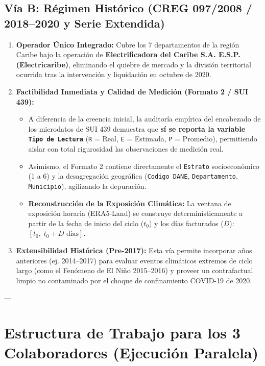 \documentclass[11pt,a4paper]{article}
\begin{document}
\subsection{Vía B: Régimen Histórico (CREG 097/2008 / 2018--2020 y Serie Extendida)}
\begin{enumerate}[label=\alph*.]
    \item \textbf{Operador Único Integrado:} Cubre los 7 departamentos de la región Caribe bajo la operación de 
    \textbf{Electrificadora del Caribe S.A. E.S.P. (Electricaribe)}, eliminando el quiebre de mercado y la división 
    territorial ocurrida tras la intervención y liquidación en octubre de 2020.
    \item \textbf{Factibilidad Inmediata y Calidad de Medición (Formato 2 / SUI 439):}
    \begin{itemize}
        \item A diferencia de la creencia inicial, la auditoría empírica del encabezado de los microdatos de SUI 439 
        demuestra que \textbf{sí se reporta la variable \texttt{Tipo de Lectura}} (\texttt{R} = Real, \texttt{E} = Estimada, \texttt{P} = Promedio), 
        permitiendo aislar con total rigurosidad las observaciones de medición real.
        \item Asimismo, el Formato 2 contiene directamente el \texttt{Estrato} socioeconómico (1 a 6) y la desagregación 
        geográfica (\texttt{Codigo DANE}, \texttt{Departamento}, \texttt{Municipio}), agilizando la depuración.
        \item \textbf{Reconstrucción de la Exposición Climática:} La ventana de exposición horaria (ERA5-Land) 
        se construye determinísticamente a partir de la fecha de inicio del ciclo ($t_0$) y los días facturados ($D$): 
        $[t_0, \; t_0 + D \text{ días}]$.
    \end{itemize}
    \item \textbf{Extensibilidad Histórica (Pre-2017):} Esta vía permite incorporar años anteriores (ej. 2014--2017) 
    para evaluar eventos climáticos extremos de ciclo largo (como el Fenómeno de El Niño 2015--2016) y proveer 
    un contrafactual limpio no contaminado por el choque de confinamiento COVID-19 de 2020.
\end{enumerate}

---

\section{Estructura de Trabajo para los 3 Colaboradores (Ejecución Paralela)}
\end{document}
